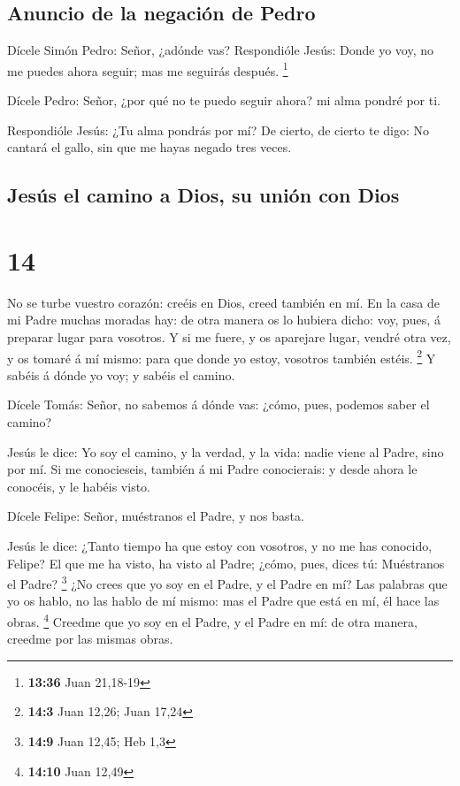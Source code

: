 \hypertarget{anuncio-de-la-negaciuxf3n-de-pedro}{%
\subsection{Anuncio de la negación de
Pedro}\label{anuncio-de-la-negaciuxf3n-de-pedro}}

 Dícele Simón Pedro: Señor, ¿adónde vas? Respondióle
Jesús: Donde yo voy, no me puedes ahora seguir; mas me seguirás después.
\footnote{\textbf{13:36} Juan 21,18-19}

 Dícele Pedro: Señor, ¿por qué no te puedo seguir ahora?
mi alma pondré por ti.

 Respondióle Jesús: ¿Tu alma pondrás por mí? De cierto,
de cierto te digo: No cantará el gallo, sin que me hayas negado tres
veces.

\hypertarget{jesuxfas-el-camino-a-dios-su-uniuxf3n-con-dios}{%
\subsection{Jesús el camino a Dios, su unión con
Dios}\label{jesuxfas-el-camino-a-dios-su-uniuxf3n-con-dios}}

\hypertarget{section-13}{%
\section{14}\label{section-13}}

 No se turbe vuestro corazón: creéis en Dios, creed
también en mí.  En la casa de mi Padre muchas moradas hay:
de otra manera os lo hubiera dicho: voy, pues, á preparar lugar para
vosotros.  Y si me fuere, y os aparejare lugar, vendré
otra vez, y os tomaré á mí mismo: para que donde yo estoy, vosotros
también estéis. \footnote{\textbf{14:3} Juan 12,26; Juan 17,24}
 Y sabéis á dónde yo voy; y sabéis el camino.

 Dícele Tomás: Señor, no sabemos á dónde vas: ¿cómo, pues,
podemos saber el camino?

 Jesús le dice: Yo soy el camino, y la verdad, y la vida:
nadie viene al Padre, sino por mí.  Si me conocieseis,
también á mi Padre conocierais: y desde ahora le conocéis, y le habéis
visto.

 Dícele Felipe: Señor, muéstranos el Padre, y nos basta.

 Jesús le dice: ¿Tanto tiempo ha que estoy con vosotros, y
no me has conocido, Felipe? El que me ha visto, ha visto al Padre;
¿cómo, pues, dices tú: Muéstranos el Padre? \footnote{\textbf{14:9} Juan
  12,45; Heb 1,3}  ¿No crees que yo soy en el Padre, y el
Padre en mí? Las palabras que yo os hablo, no las hablo de mí mismo: mas
el Padre que está en mí, él hace las obras. \footnote{\textbf{14:10}
  Juan 12,49}  Creedme que yo soy en el Padre, y el Padre
en mí: de otra manera, creedme por las mismas obras.

